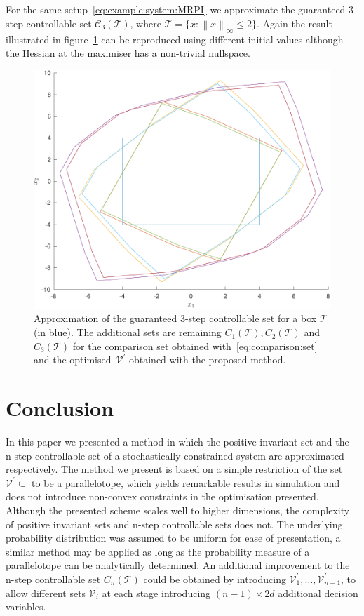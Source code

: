 \documentclass{ifacconf}
\providecommand{\norm}[1]{\left\|#1\right\|}
\providecommand{\C}{\mathcal C}
\providecommand{\V}{\mathcal V}
\providecommand{\T}{\mathcal T}
\begin{document}
For the same setup~\eqref{eq:example:system:MRPI} we approximate the guaranteed 3-step controllable set $\C_3(\T)$, where $\T=\{x:\norm{x}_\infty\leq 2\}$.
%
Again the result illustrated in figure~\ref{fig:n:step:controllable:set} can be reproduced using different initial values although the Hessian at the maximiser has a non-trivial nullspace.
%

\begin{figure}
\includegraphics[width=.95\linewidth]{NStepSetOptimised.pdf}
\caption{Approximation of the guaranteed 3-step controllable set for a box $\T$ (in blue). The additional sets are remaining $C_1(\T),C_2(\T)$ and $C_3(\T)$ for the comparison set obtained with~\eqref{eq:comparison:set} and the optimised~$\V^\prime$ obtained with the proposed method.}
\label{fig:n:step:controllable:set}
\vspace{4mm}\end{figure}



\section{Conclusion}\label{sec:conclusion}
%
%
In this paper we presented a method in which the positive invariant set and the n-step controllable set of a stochastically constrained system are approximated respectively.
%
The method we present is based on a simple restriction of the set $\V^\prime\subseteq$ to be a parallelotope, which yields remarkable results in simulation and does not introduce non-convex constraints in the optimisation presented.
%
Although the presented scheme scales well to higher dimensions, the complexity of positive invariant sets and n-step controllable sets does not.
%
The underlying probability distribution was assumed to be uniform for ease of presentation, a similar method may be applied as long as the probability measure of a parallelotope can be analytically determined.
%
An additional improvement to the n-step controllable set $C_n(\T)$ could be obtained by introducing $\V_1^\prime,\dots,\V_{n-1}^\prime$, to allow different sets $\V_i^\prime$ at each stage introducing $(n-1)\times 2d$ additional decision variables.


%

\end{document}
